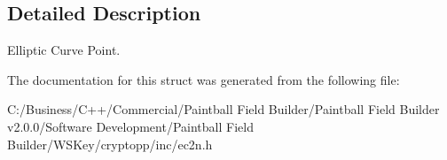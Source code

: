 \subsection{Detailed Description}
Elliptic Curve Point. 

The documentation for this struct was generated from the following file:\begin{DoxyCompactItemize}
\item 
C:/Business/C++/Commercial/Paintball Field Builder/Paintball Field Builder v2.0.0/Software Development/Paintball Field Builder/WSKey/cryptopp/inc/ec2n.h\end{DoxyCompactItemize}
